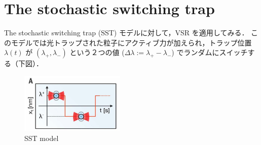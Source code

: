 \documentclass{jsarticle}
\numberwithin{equation}{section}
\theoremstyle{definition}
\begin{document}
\newpage 
\section{The stochastic switching trap}
The stochastic switching trap (SST) モデルに対して，VSR を適用してみる．
このモデルでは光トラップされた粒子にアクティブ力が加えられ，トラップ位置 $\lambda (t)$ が $( \lambda_+, \lambda_- )$ という２つの値 ($\Delta \lambda := \lambda_+ - \lambda_-$) でランダムにスイッチする（下図）．

\begin{figure}[H]
  \begin{center}  
  \includegraphics[width=5cm]{vsr_fig2a.png}  
  \end{center}
  \caption{SST model}
\end{figure}
\end{document}
